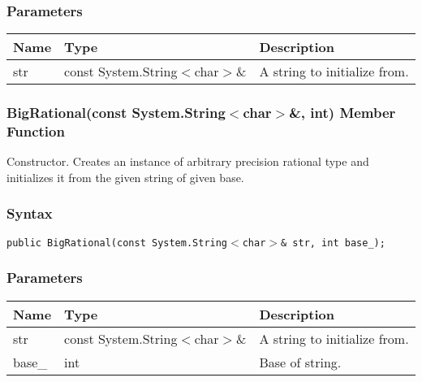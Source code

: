 \documentclass[a4paper,oneside,11.000000pt]{book}
\begin{document}
\subsubsection*{Parameters}
\begin{flushleft}
\begin{supertabular}[l]{lll}
\textbf{Name}
& \textbf{Type}
& \textbf{Description}
\\
\hline
str
& const System.\-String$<$\-char$>$\-\&\-
& A string to initialize from.

\\
\end{supertabular}

\end{flushleft}
\clearpage

\hypertarget{System.Numerics.Multiprecision.BigRational.constructor.P.System.Numerics.Multiprecision.BigRational.C.R.System.String.char.int}{\subsubsection*{BigRational(const System.String$<$char$>$\&, int) Member Function}}
\begin{flushleft}
Constructor. Creates an instance of arbitrary precision rational type and initializes it from the given string of given base.

\end{flushleft}
\subsubsection*{Syntax}
\texttt{public BigRational(const System.String$<$char$>$\& str, int base\_);}
\subsubsection*{Parameters}
\begin{flushleft}
\begin{supertabular}[l]{lll}
\textbf{Name}
& \textbf{Type}
& \textbf{Description}
\\
\hline
str
& const System.\-String$<$\-char$>$\-\&\-
& A string to initialize from.

\\
base\_
& int
& Base of string.

\\
\end{supertabular}

\end{flushleft}
\clearpage
\end{document}
